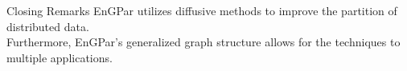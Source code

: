 \documentclass{beamer}
\begin{document}
\begin{textblock}{15.6}
\begin{textblock}{5.2}
    \begin{block}{\centering Closing Remarks}
      EnGPar utilizes diffusive methods to improve the partition of distributed data. \\
      Furthermore, EnGPar's generalized graph structure allows for the techniques to \\
      multiple applications.
    \end{block}
  \end{textblock}
\end{textblock}
\end{document}
